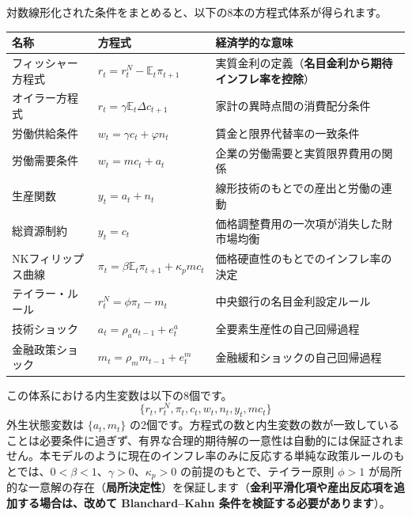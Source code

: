 \documentclass[
  japanese,
  lualatex,
  ja=standard,
  12pt,
  a4paper]{ltjsarticle}
\newcounter{none} %
\begin{document}
対数線形化された条件をまとめると、以下の8本の方程式体系が得られます。

{\def\LTcaptype{none} %
\begin{longtable}[]{@{}
  >{\raggedright\arraybackslash}p{}
  >{\raggedright\arraybackslash}p{}
  >{\raggedright\arraybackslash}p{}@{}}
\toprule\noalign{}
\begin{minipage}[b]{\linewidth}\raggedright
名称
\end{minipage} & \begin{minipage}[b]{\linewidth}\raggedright
方程式
\end{minipage} & \begin{minipage}[b]{\linewidth}\raggedright
経済学的な意味
\end{minipage} \\
\midrule\noalign{}
\endhead
\bottomrule\noalign{}
\endlastfoot
フィッシャー方程式 & \(r_t=r_t^N-\mathbb{E}_t\pi_{t+1}\) &
実質金利の定義（\textbf{名目金利から期待インフレ率を控除}） \\
オイラー方程式 & \(r_t=\gamma\mathbb{E}_t\Delta c_{t+1}\) &
家計の異時点間の消費配分条件 \\
労働供給条件 & \(w_t=\gamma c_t+\varphi n_t\) &
賃金と限界代替率の一致条件 \\
労働需要条件 & \(w_t=mc_t+a_t\) & 企業の労働需要と実質限界費用の関係 \\
生産関数 & \(y_t=a_t+n_t\) & 線形技術のもとでの産出と労働の連動 \\
総資源制約 & \(y_t=c_t\) & 価格調整費用の一次項が消失した財市場均衡 \\
NKフィリップス曲線 & \(\pi_t=\beta\mathbb{E}_t\pi_{t+1}+\kappa_p mc_t\)
& 価格硬直性のもとでのインフレ率の決定 \\
テイラー・ルール & \(r_t^N=\phi\pi_t-m_t\) &
中央銀行の名目金利設定ルール \\
技術ショック & \(a_t=\rho_a a_{t-1}+e_t^a\) &
全要素生産性の自己回帰過程 \\
金融政策ショック & \(m_t=\rho_m m_{t-1}+e_t^m\) &
金融緩和ショックの自己回帰過程 \\
\end{longtable}
}

この体系における内生変数は以下の8個です。 \[
\{r_t,r_t^N,\pi_t,c_t,w_t,n_t,y_t,mc_t\}
\] 外生状態変数は \(\{a_t, m_t\}\)
の2個です。方程式の数と内生変数の数が一致していることは必要条件に過ぎず、有界な合理的期待解の一意性は自動的には保証されません。本モデルのように現在のインフレ率のみに反応する単純な政策ルールのもとでは、\(0<\beta<1\)、\(\gamma>0\)、\(\kappa_p>0\)
の前提のもとで、テイラー原則 \(\phi>1\)
が局所的な一意解の存在（\textbf{局所決定性}）を保証します（\textbf{金利平滑化項や産出反応項を追加する場合は、改めて
Blanchard--Kahn 条件を検証する必要があります}）。
\end{document}
